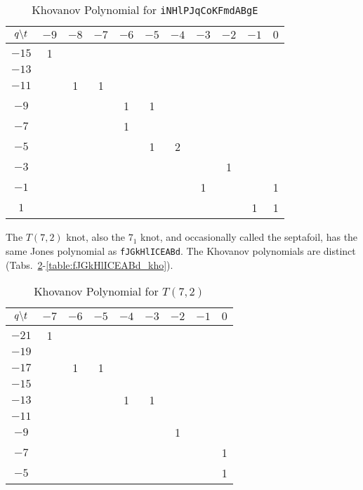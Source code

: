 \documentclass{article}
\theoremstyle{plain}
\begin{document}
        \begin{table}[H]
            \centering
            \begin{tabular}{| c | c | c | c | c | c | c | c | c | c | c |}
                \hline
                $q\symbol{92}t$&$-9$&$-8$&$-7$&$-6$&$-5$&$-4$&$-3$&$-2$&$-1$&$0$\\
                \hline
                $-15$&1&&&&&&&&&\\
                \hline
                $-13$&&&&&&&&&&\\
                \hline
                $-11$&&1&1&&&&&&&\\
                \hline
                $-9$&&&&1&1&&&&&\\
                \hline
                $-7$&&&&1&&&&&&\\
                \hline
                $-5$&&&&&1&2&&&&\\
                \hline
                $-3$&&&&&&&&1&&\\
                \hline
                $-1$&&&&&&&1&&&1\\
                \hline
                $1$&&&&&&&&&1&1\\
                \hline
            \end{tabular}
            \caption{Khovanov Polynomial for \texttt{iNHlPJqCoKFmdABgE}}
            \label{table:iNHlPJqCoKFmdABgE_kho}
        \end{table}
        The $T(7,2)$ knot, also the $7_{1}$ knot, and occasionally called the
        septafoil, has the same Jones polynomial as \texttt{fJGkHlICEABd}. The
        Khovanov polynomials are distinct
        (Tabs.~\ref{table:t_7_2_kho}-\ref{table:fJGkHlICEABd_kho}).
        \begin{table}[H]
            \centering
            \begin{tabular}{| c | c | c | c | c | c | c | c | c |}
                \hline
                $q\symbol{92}t$&$-7$&$-6$&$-5$&$-4$&$-3$&$-2$&$-1$&$0$\\
                \hline
                $-21$&1&&&&&&&\\
                \hline
                $-19$&&&&&&&&\\
                \hline
                $-17$&&1&1&&&&&\\
                \hline
                $-15$&&&&&&&&\\
                \hline
                $-13$&&&&1&1&&&\\
                \hline
                $-11$&&&&&&&&\\
                \hline
                $-9$&&&&&&1&&\\
                \hline
                $-7$&&&&&&&&1\\
                \hline
                $-5$&&&&&&&&1\\
                \hline
            \end{tabular}
            \caption{Khovanov Polynomial for $T(7,2)$}
            \label{table:t_7_2_kho}
        \end{table}
\end{document}

